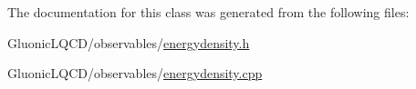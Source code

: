 The documentation for this class was generated from the following files\+:\begin{DoxyCompactItemize}
\item 
Gluonic\+L\+Q\+C\+D/observables/\mbox{\hyperlink{energydensity_8h}{energydensity.\+h}}\item 
Gluonic\+L\+Q\+C\+D/observables/\mbox{\hyperlink{energydensity_8cpp}{energydensity.\+cpp}}\end{DoxyCompactItemize}
